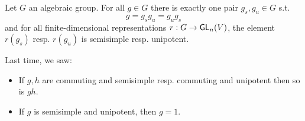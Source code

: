 
\begin{theorem}
Let $G$ an algebraic group. For all $g \in G$ there is exactly one pair $g_s, g_u \in G$ s.t.
\[g = g_s g_u = g_u g_s\]
and for all finite-dimensional representations $r : G \overset{}{\rightarrow} \textsf{GL}_n(V)$, the element $r(g_s)$ resp. $r(g_u)$ is semisimple resp. unipotent.
\end{theorem}
Last time, we saw:
\begin{lemma}
	\begin{itemize}
		\item	If $g,h$ are commuting and semisimple resp. commuting and unipotent then so is $gh$.
		\item If $g$ is semisimple and unipotent, then $g = 1$.
	\end{itemize}
\end{lemma}

